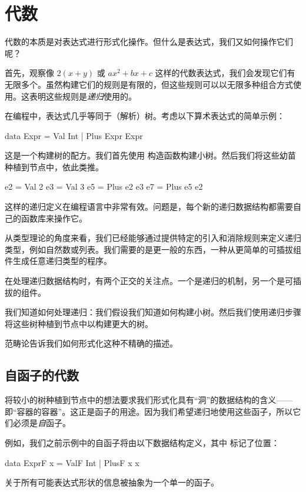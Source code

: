 \documentclass[DaoFP]{subfiles}
\begin{document}
\setcounter{chapter}{10}

\chapter{代数}

代数的本质是对表达式进行形式化操作。但什么是表达式，我们又如何操作它们呢？

首先，观察像 $2 (x + y)$ 或 $a x^2 + b x + c$ 这样的代数表达式，我们会发现它们有无限多个。虽然构建它们的规则是有限的，但这些规则可以以无限多种组合方式使用。这表明这些规则是\emph{递归}使用的。

在编程中，表达式几乎等同于（解析）树。考虑以下算术表达式的简单示例：
\begin{haskell}
data Expr = Val Int 
          | Plus Expr Expr
\end{haskell}
这是一个构建树的配方。我们首先使用  构造函数构建小树。然后我们将这些幼苗种植到节点中，依此类推。
\begin{haskell}
e2 = Val 2
e3 = Val 3
e5 = Plus e2 e3
e7 = Plus e5 e2
\end{haskell}

这样的递归定义在编程语言中非常有效。问题是，每个新的递归数据结构都需要自己的函数库来操作它。

从类型理论的角度来看，我们已经能够通过提供特定的引入和消除规则来定义递归类型，例如自然数或列表。我们需要的是更一般的东西，一种从更简单的可插拔组件生成任意递归类型的程序。

在处理递归数据结构时，有两个正交的关注点。一个是递归的机制，另一个是可插拔的组件。

我们知道如何处理递归：我们假设我们知道如何构建小树。然后我们使用递归步骤将这些树种植到节点中以构建更大的树。

范畴论告诉我们如何形式化这种不精确的描述。

\section{自函子的代数}

将较小的树种植到节点中的想法要求我们形式化具有“洞”的数据结构的含义——即“容器的容器”。这正是函子的用途。因为我们希望递归地使用这些函子，所以它们必须是\emph{自}函子。

例如，我们之前示例中的自函子将由以下数据结构定义，其中  标记了位置：
\begin{haskell}
data ExprF x = ValF Int 
             | PlusF x x
\end{haskell}
关于所有可能表达式形状的信息被抽象为一个单一的函子。
\end{document}
